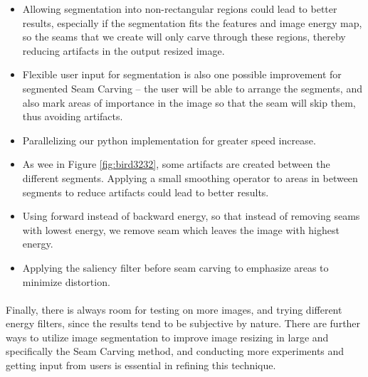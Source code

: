 \documentclass[conference]{acmsiggraph}
\begin{document}
\begin{itemize}
  \item Allowing segmentation into non-rectangular regions could lead to better results, especially if the segmentation fits the features and image energy map, so the seams that we create will only carve through these regions, thereby reducing artifacts in the output resized image.
  \item Flexible user input for segmentation is also one possible improvement for segmented Seam Carving -- the user will be able to arrange the segments, and also mark areas of importance in the image so that the seam will skip them, thus avoiding  artifacts. 
  \item Parallelizing our python implementation for greater speed increase.
  \item As wee in Figure \ref{fig:bird3232}, some artifacts are created between the different segments. Applying a small smoothing operator to areas in between segments to reduce artifacts could lead to better results.
  \item Using forward instead of backward energy, so that instead of removing seams with lowest energy, we remove seam which leaves the image with highest energy.
  \item Applying the saliency filter before seam carving to emphasize areas to minimize distortion.  
\end{itemize}


\paragraph{}
Finally, there is always room for testing on more images, and trying different energy filters, since the results tend to be subjective by nature. There are further ways to utilize image segmentation to improve image resizing in large and specifically the Seam Carving method, and conducting more experiments and getting input from users is essential in refining this technique. 



\end{document}
